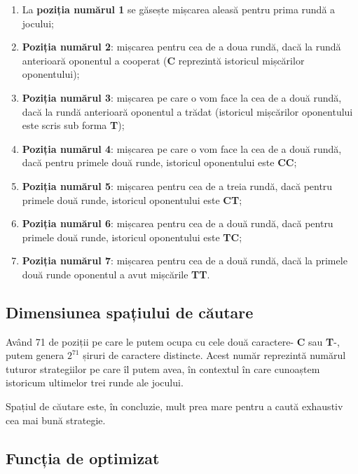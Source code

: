 \begin{enumerate}
	
	\item La \textbf{poziția numărul 1} se găsește mișcarea aleasă pentru prima rundă a jocului;
	
	\item \textbf{Poziția numărul 2}: mișcarea pentru cea de a doua rundă, dacă la rundă anterioară oponentul a cooperat (\textbf{C} reprezintă istoricul mișcărilor oponentului);
	
	\item \textbf{Poziția numărul 3}: mișcarea pe care o vom face la cea de a două rundă, dacă la rundă anterioară oponentul a trădat (istoricul mișcărilor oponentului este scris sub forma \textbf{T});
	
	\item \textbf{Poziția numărul 4}: mișcarea pe care o vom face la cea de a două rundă, dacă pentru primele două runde, istoricul oponentului este \textbf{CC};
	
	\item \textbf{Poziția numărul 5}: mișcarea pentru cea de a treia rundă, dacă pentru primele două runde, istoricul oponentului este \textbf{CT};
	
	\item \textbf{Poziția numărul 6}: mișcarea pentru cea de a două rundă, dacă pentru primele două runde, istoricul oponentului este \textbf{TC};
	
	\item \textbf{Poziția numărul 7}: mișcarea pentru cea de a două rundă, dacă la primele două runde oponentul a avut mișcările \textbf{TT}.
	
\end{enumerate}

\subsection{Dimensiunea spațiului de căutare}

Având 71 de poziții pe care le putem ocupa cu cele două caractere- \textbf{C} sau \textbf{T}-, putem genera $2^71$ șiruri de caractere distincte. Acest număr reprezintă numărul tuturor strategiilor pe care îl putem avea, în contextul în care cunoaștem istoricum ultimelor trei runde ale jocului.  

Spațiul de căutare este, în concluzie, mult prea mare pentru a caută exhaustiv cea mai bună strategie.

\subsection{Funcția de optimizat}

